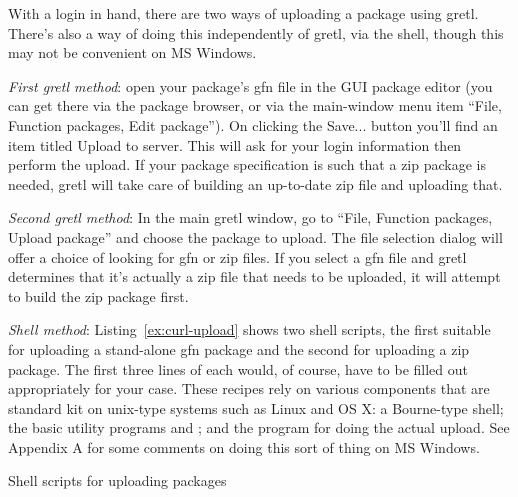 \documentclass[oneside]{book}
\begin{document}
With a login in hand, there are two ways of uploading a package using
gretl. There's also a way of doing this independently of gretl, via
the shell, though this may not be convenient on MS Windows.

\textit{First gretl method}: open your package's \textsf{gfn} file in
the GUI package editor (you can get there via the package browser, or
via the main-window menu item ``File, Function packages, Edit
package'').  On clicking the \textsf{Save...} button you'll find an
item titled \textsf{Upload to server}. This will ask for your login
information then perform the upload. If your package specification is
such that a zip package is needed, gretl will take care of building an
up-to-date zip file and uploading that.

\textit{Second gretl method}: In the main gretl window, go to ``File,
Function packages, Upload package'' and choose the package to
upload. The file selection dialog will offer a choice of looking for
\textsf{gfn} or \textsf{zip} files. If you select a gfn file
and gretl determines that it's actually a zip file that needs
to be uploaded, it will attempt to build the zip package first.

\textit{Shell method}: Listing~\ref{ex:curl-upload} shows two shell
scripts, the first suitable for uploading a stand-alone gfn package
and the second for uploading a zip package. The first three lines of
each would, of course, have to be filled out appropriately for your
case.  These recipes rely on various components that are standard kit
on unix-type systems such as Linux and OS X: a Bourne-type shell; the
basic utility programs  and ; and the
 program for doing the actual upload. See Appendix A for
some comments on doing this sort of thing on MS Windows.

\begin{script}[htbp]
  \centering
  \caption{Shell scripts for uploading packages}
  \label{ex:curl-upload}
\end{script}
\end{document}
